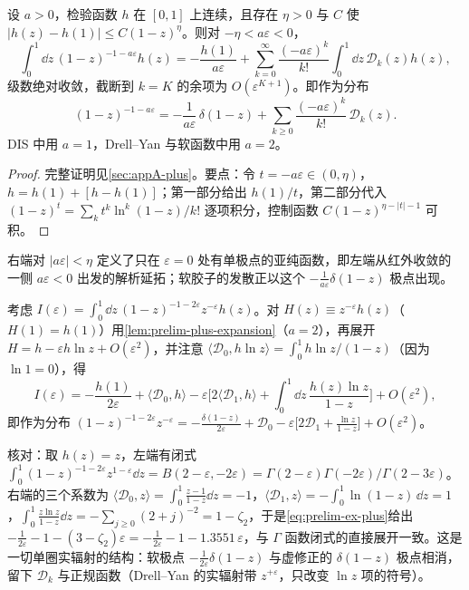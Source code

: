 \begin{lemma}\label{lem:prelim-plus-expansion}
设 $a>0$，检验函数 $h$ 在 $[0,1]$ 上连续，且存在 $\eta>0$ 与 $C$ 使 $|h(z)-h(1)|\le C(1-z)^\eta$。则对 $-\eta<a\varepsilon<0$，
\begin{equation}\label{eq:prelim-plus-expansion}
\int_0^1\dd z\,(1-z)^{-1-a\varepsilon}h(z)=-\frac{h(1)}{a\varepsilon}+\sum_{k=0}^\infty\frac{(-a\varepsilon)^k}{k!}\int_0^1\dd z\,\mathcal D_k(z)h(z),
\end{equation}
级数绝对收敛，截断到 $k=K$ 的余项为 $O(\varepsilon^{K+1})$。即作为分布
\[
(1-z)^{-1-a\varepsilon}=-\frac1{a\varepsilon}\,\delta(1-z)+\sum_{k\ge0}\frac{(-a\varepsilon)^k}{k!}\,\mathcal D_k(z).
\]
DIS 中用 $a=1$，Drell--Yan 与软函数中用 $a=2$。
\end{lemma}

\begin{proof}
完整证明见\cref{sec:appA-plus}。要点：令 $t=-a\varepsilon\in(0,\eta)$，$h=h(1)+[h-h(1)]$；第一部分给出 $h(1)/t$，第二部分代入 $(1-z)^{t}=\sum_kt^k\ln^k(1-z)/k!$ 逐项积分，控制函数 $C(1-z)^{\eta-|t|-1}$ 可积。
\end{proof}

右端对 $|a\varepsilon|<\eta$ 定义了只在 $\varepsilon=0$ 处有单极点的亚纯函数，即左端从红外收敛的一侧 $a\varepsilon<0$ 出发的解析延拓；软胶子的发散正以这个 $-\frac1{a\varepsilon}\delta(1-z)$ 极点出现。

\begin{example}[单圈实辐射的典型积分]\label{ex:prelim-plus}
考虑 $I(\varepsilon)=\int_0^1\dd z\,(1-z)^{-1-2\varepsilon}z^{-\varepsilon}h(z)$。对 $H(z)\equiv z^{-\varepsilon}h(z)$（$H(1)=h(1)$）用\cref{lem:prelim-plus-expansion}（$a=2$），再展开 $H=h-\varepsilon h\ln z+O(\varepsilon^2)$，并注意 $\langle\mathcal D_0,h\ln z\rangle=\int_0^1h\ln z/(1-z)$（因为 $\ln1=0$），得
\begin{equation}\label{eq:prelim-ex-plus}
I(\varepsilon)=-\frac{h(1)}{2\varepsilon}+\langle\mathcal D_0,h\rangle-\varepsilon\Big[2\langle\mathcal D_1,h\rangle+\int_0^1\dd z\,\frac{h(z)\ln z}{1-z}\Big]+O(\varepsilon^2),
\end{equation}
即作为分布 $(1-z)^{-1-2\varepsilon}z^{-\varepsilon}=-\frac{\delta(1-z)}{2\varepsilon}+\mathcal D_0-\varepsilon\big[2\mathcal D_1+\frac{\ln z}{1-z}\big]+O(\varepsilon^2)$。

核对：取 $h(z)=z$，左端有闭式 $\int_0^1(1-z)^{-1-2\varepsilon}z^{1-\varepsilon}\dd z=B(2-\varepsilon,-2\varepsilon)=\Gamma(2-\varepsilon)\Gamma(-2\varepsilon)/\Gamma(2-3\varepsilon)$。右端的三个系数为 $\langle\mathcal D_0,z\rangle=\int_0^1\frac{z-1}{1-z}\dd z=-1$，$\langle\mathcal D_1,z\rangle=-\int_0^1\ln(1-z)\,\dd z=1$，$\int_0^1\frac{z\ln z}{1-z}\dd z=-\sum_{j\ge0}(2+j)^{-2}=1-\zeta_2$，于是\cref{eq:prelim-ex-plus}给出 $-\frac1{2\varepsilon}-1-(3-\zeta_2)\varepsilon=-\frac1{2\varepsilon}-1-1.3551\,\varepsilon$，与 $\Gamma$ 函数闭式的直接展开一致。这是一切单圈实辐射的结构：软极点 $-\frac{1}{2\varepsilon}\delta(1-z)$ 与虚修正的 $\delta(1-z)$ 极点相消，留下 $\mathcal D_k$ 与正规函数（Drell--Yan 的实辐射带 $z^{+\varepsilon}$，只改变 $\ln z$ 项的符号）。
\end{example}

